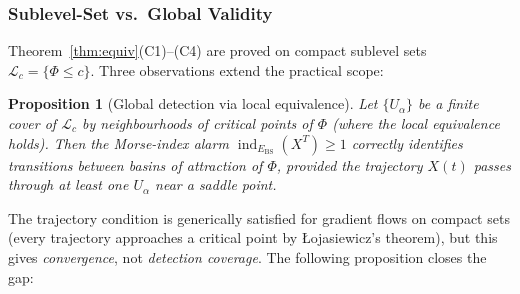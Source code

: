 \documentclass[11pt,a4paper]{article}
\newcommand{\Ebs}{E_{\mathrm{BS}}}
\DeclareMathOperator{\ind}{ind}
\newtheorem{proposition}[theorem]{Proposition}
\begin{document}
\subsubsection{Sublevel-Set vs.\ Global Validity}

Theorem~\ref{thm:equiv}(C1)--(C4) are proved on compact sublevel sets
$\mathcal{L}_c = \{\Phi \le c\}$.  Three observations extend
the practical scope:

\begin{proposition}[Global detection via local equivalence]
\label{prop:local_global}
Let $\{U_\alpha\}$ be a finite cover of $\mathcal{L}_c$ by
neighbourhoods of critical points of $\Phi$ (where the local
equivalence holds). Then the Morse-index alarm
$\ind_{\Ebs}(X^T) \ge 1$ correctly identifies transitions
between basins of attraction of $\Phi$, provided the
trajectory $X(t)$ passes through at least one $U_\alpha$ near
a saddle point.
\end{proposition}

The trajectory condition is generically satisfied for gradient
flows on compact sets (every trajectory approaches a critical
point by \L{}ojasiewicz's theorem), but this gives \emph{convergence},
not \emph{detection coverage}.  The following proposition closes
the gap:
\end{document}
